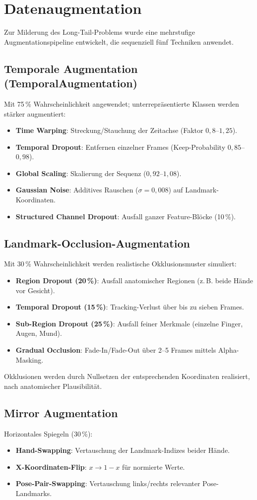 \section{Datenaugmentation}
Zur Milderung des Long-Tail-Problems wurde eine mehrstufige Augmentationspipeline entwickelt, die sequenziell fünf Techniken anwendet.

\subsection{Temporale Augmentation (TemporalAugmentation)}
Mit 75\,\% Wahrscheinlichkeit angewendet; unterrepräsentierte Klassen werden stärker augmentiert:
\begin{itemize}
    \item \textbf{Time Warping}: Streckung/Stauchung der Zeitachse (Faktor $0{,}8$–$1{,}25$).
    \item \textbf{Temporal Dropout}: Entfernen einzelner Frames (Keep-Probability $0{,}85$–$0{,}98$).
    \item \textbf{Global Scaling}: Skalierung der Sequenz ($0{,}92$–$1{,}08$).
    \item \textbf{Gaussian Noise}: Additives Rauschen ($\sigma=0{,}008$) auf Landmark-Koordinaten.
    \item \textbf{Structured Channel Dropout}: Ausfall ganzer Feature-Blöcke (10\,\%).
\end{itemize}

\subsection{Landmark-Occlusion-Augmentation}
Mit 30\,\% Wahrscheinlichkeit werden realistische Okklusionsmuster simuliert:
\begin{itemize}
    \item \textbf{Region Dropout (20\,\%)}: Ausfall anatomischer Regionen (z.\,B. beide Hände vor Gesicht).
    \item \textbf{Temporal Dropout (15\,\%)}: Tracking-Verlust über bis zu sieben Frames.
    \item \textbf{Sub-Region Dropout (25\,\%)}: Ausfall feiner Merkmale (einzelne Finger, Augen, Mund).
    \item \textbf{Gradual Occlusion}: Fade-In/Fade-Out über 2–5 Frames mittels Alpha-Masking.
\end{itemize}
Okklusionen werden durch Nullsetzen der entsprechenden Koordinaten realisiert, nach anatomischer Plausibilität.

\subsection{Mirror Augmentation}
Horizontales Spiegeln (30\,\%):
\begin{itemize}
    \item \textbf{Hand-Swapping}: Vertauschung der Landmark-Indizes beider Hände.
    \item \textbf{X-Koordinaten-Flip}: $x \rightarrow 1-x$ für normierte Werte.
    \item \textbf{Pose-Pair-Swapping}: Vertauschung links/rechts relevanter Pose-Landmarks.
\end{itemize}

